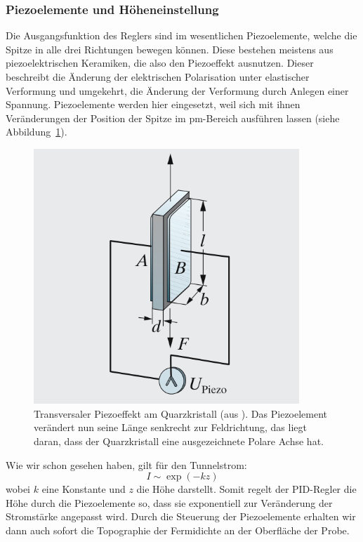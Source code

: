 \subsubsection{Piezoelemente und Höheneinstellung}
Die Ausgangsfunktion des Reglers sind im wesentlichen Piezoelemente, welche die Spitze in alle
drei Richtungen bewegen können. Diese bestehen meistens aus piezoelektrischen Keramiken, die also
den Piezoeffekt ausnutzen. Dieser beschreibt die Änderung der elektrischen Polarisation
unter elastischer Verformung und umgekehrt, die Änderung der Verformung durch Anlegen einer 
Spannung. Piezoelemente werden hier eingesetzt, weil sich mit ihnen Veränderungen der Position 
der Spitze im pm-Bereich ausführen lassen (siehe Abbildung~\ref{fig:piezoeffekt}). 
\begin{figure}[h]
\includegraphics[width=10cm]{pics/piezoeffekt}
\caption{Transversaler Piezoeffekt am Quarzkristall (aus \cite{vogel1997gerthsen}). 
Das Piezoelement verändert nun seine Länge senkrecht zur Feldrichtung, das liegt daran, dass der
Quarzkristall eine ausgezeichnete Polare Achse hat. 
} 
\label{fig:piezoeffekt}
\end{figure}
Wie wir schon gesehen haben, gilt für den Tunnelstrom:
\begin{equation}
I \sim \exp(-kz) 
\end{equation}
wobei $k$ eine Konstante und $z$ die Höhe darstellt. Somit regelt der PID-Regler die Höhe durch
die Piezoelemente so, dass sie exponentiell zur Veränderung der Stromstärke angepasst wird.
Durch die Steuerung der Piezoelemente erhalten wir dann auch sofort die Topographie der
Fermidichte an der Oberfläche der Probe.


